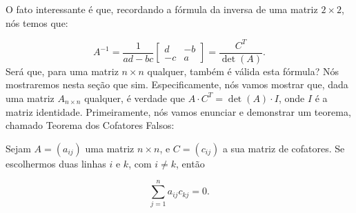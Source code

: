 O fato interessante é que, recordando a fórmula da inversa de uma matriz $2\times 2$, nós temos que:

$$
A^{-1} = \dfrac{1}{ad - bc}\begin{bmatrix}
	d & -b \\
	-c & a
\end{bmatrix} = \dfrac{C^T}{\det(A)}.
$$
Será que, para uma matriz $n\times n$ qualquer, também é válida esta fórmula? Nós mostraremos nesta seção que sim. Especificamente, nós vamos mostrar que, dada uma matriz $A_{n\times n}$ qualquer, é verdade que $A\cdot C^T = \det(A)\cdot I$, onde $I$ é a matriz identidade. Primeiramente, nós vamos enunciar e demonstrar um teorema, chamado Teorema dos Cofatores Falsos:

\begin{Theorem}
	Sejam $A = (a_{ij})$ uma matriz $n\times n$, e $C = (c_{ij})$ a sua matriz de cofatores. Se escolhermos duas linhas $i$ e $k$, com $i\neq k$, então
	
	$$
	\sum\limits_{j = 1}^{n} a_{ij}c_{kj} = 0.
	$$
\end{Theorem}

